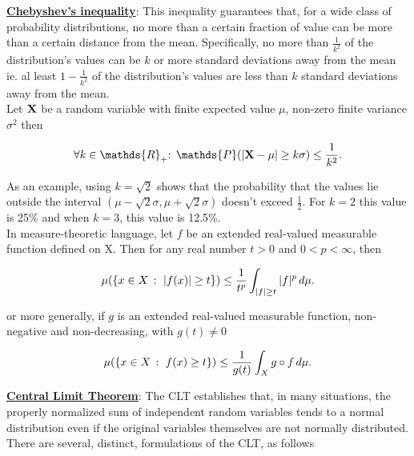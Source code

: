 \documentclass{homework}
\begin{document}
\underline{\textbf{Chebyshev's inequality}}: This inequality guarantees that, for a wide class of probability distributions, no more than a certain fraction of value can be more than a certain distance from the mean. Specifically, no more than $\frac{1}{k^2}$ of the distribution's values can be $k$ or more standard deviations away from the mean ie. al least $1-\frac{1}{k^2}$ of the distribution's values are less than $k$ standard deviations away from the mean. \\

Let ${\bf X}$ be a random variable with finite expected value $\mu$, non-zero finite variance $\sigma^2$ then

$$
\forall k \in \mathds{R}_+ \textnormal{: } \mathds{P}(|{\bf X} - \mu| \geq k\sigma) \leq \frac{1}{k^2}. 
$$

As an example, using $k=\sqrt{2}$ shows that the probability that the values lie outside the interval $(\mu - \sqrt{2}\sigma, \mu+ \sqrt{2}\sigma)$ doesn't exceed $\frac{1}{2}$. For $k=2$ this value is 25\% and when $k=3$, this value is 12.5\%. \\

In measure-theoretic language, let $f$ be an extended real-valued measurable function defined on X. Then for any real number $t > 0$ and $0 < p < \infty$, then 

$$
{\displaystyle \mu (\{x\in X\,:\,\,|f(x)|\geq t\})\leq {1 \over t^{p}}\int _{|f|\geq t}|f|^{p}\,d\mu .}
$$

or more generally, if $g$ is an extended real-valued measurable function, non-negative and non-decreasing, with ${\displaystyle g(t)\neq 0}$

$$
{\displaystyle \mu (\{x\in X\,:\,\,f(x)\geq t\})\leq {1 \over g(t)}\int _{X}g\circ f\,d\mu}.\\
$$

\underline{\textbf{Central Limit Theorem}}: The CLT establishes that, in many situations, the properly normalized sum of independent random variables tends to a normal distribution even if the original variables themselves are not normally distributed. There are several, distinct, formulations of the CLT, as follows
\end{document}
